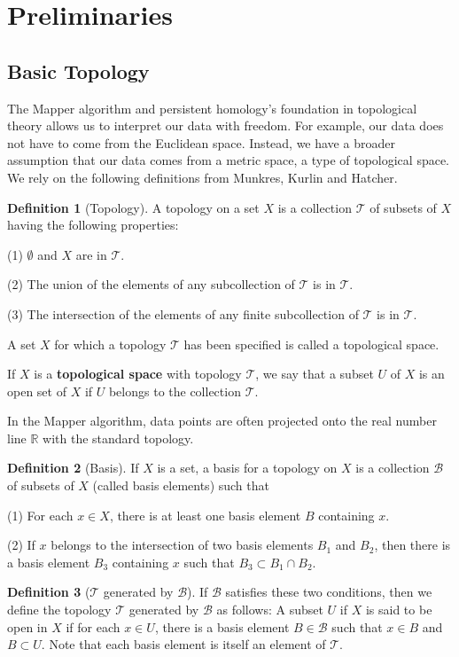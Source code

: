 \documentclass[12pt]{article}
\theoremstyle{definition}
\newtheorem{definition}{Definition}
\newcommand{\RR}{\mathbb{R}}
\begin{document}
\section{Preliminaries}
\subsection{Basic Topology}

The Mapper algorithm and persistent homology's foundation in topological theory allows us to interpret our data with freedom. For example, our data does not have to come from the Euclidean space. Instead, we have a broader assumption that our data comes from a metric space, a type of topological space. We rely on the following definitions from Munkres\cite{munkres2000topology}, Kurlin\cite{Kurlin2015PointCloud} and Hatcher\cite{hatcher2002algebraictopology}.

\begin{definition}[Topology]
A topology on a set $X$ is a collection $\mathcal{T}$ of subsets of $X$ having the following properties:

(1) $\emptyset$ and $X$ are in $\mathcal{T}$.

(2) The union of the elements of any subcollection of $\mathcal{T}$ is in $\mathcal{T}$.

(3) The intersection of the elements of any finite subcollection of $\mathcal{T}$ is in $\mathcal{T}$.

A set $X$ for which a topology $\mathcal{T}$ has been specified is called a topological space. 

If $X$ is a \textbf{topological space} with topology $\mathcal{T}$, we say that a subset $U$ of $X$ is an open set of $X$ if $U$ belongs to the collection $\mathcal{T}$.
\end{definition}
In the Mapper algorithm, data points are often projected onto the real number line $\RR$ with the standard topology.
\begin{definition}[Basis]
If $X$ is a set, a basis for a topology on $X$ is a collection $\mathcal{B}$ of subsets of $X$ (called basis elements) such that

(1) For each $x \in X$, there is at least one basis element $B$ containing $x$.

(2) If $x$ belongs to the intersection of two basis elements $B_1$ and $B_2$, then there is a basis element $B_3$ containing $x$ such that $B_3 \subset B_1 \cap B_2$.
\end{definition}

\begin{definition}[$\mathcal{T}$ generated by $\mathcal{B}$]
If $\mathcal{B}$ satisfies these two conditions, then we define the topology $\mathcal{T}$ generated by $\mathcal{B}$ as follows: A subset $U$ if $X$ is said to be open in $X$ if for each $x \in U$, there is a basis element $B \in \mathcal{B}$ such that $x \in B$ and $B \subset U$. Note that each basis element is itself an element of $\mathcal{T}$. 
\end{definition}
\end{document}

